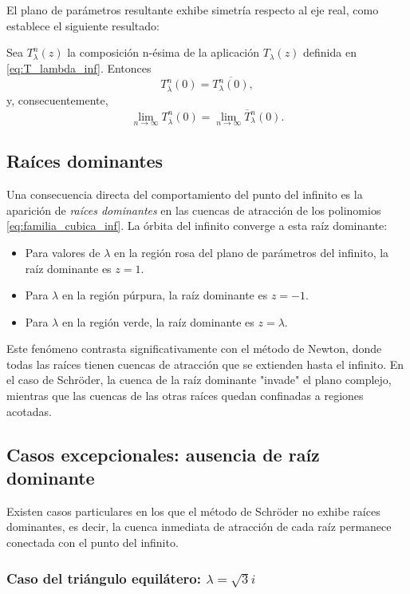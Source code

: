 El plano de parámetros resultante exhibe simetría respecto al eje real, como establece el siguiente resultado:

\begin{teorema}
Sea $T^n_\lambda(z)$ la composición n-ésima de la aplicación $T_\lambda(z)$ definida en \eqref{eq:T_lambda_inf}. Entonces
$$
T^n_{\overline{\lambda}}(0)=\overline{T^n_\lambda(0)},
$$
y, consecuentemente,
$$
\lim_{n\to\infty}T^n_{\overline{\lambda}}(0)=\overline{\lim_{n\to\infty}T^n_\lambda(0)}.
$$
\end{teorema}

\subsection{Raíces dominantes}

Una consecuencia directa del comportamiento del punto del infinito es la aparición de \emph{raíces dominantes} en las cuencas de atracción de los polinomios \eqref{eq:familia_cubica_inf}. La órbita del infinito converge a esta raíz dominante:

\begin{itemize}
\item Para valores de $\lambda$ en la región rosa del plano de parámetros del infinito, la raíz dominante es $z=1$.
\item Para $\lambda$ en la región púrpura, la raíz dominante es $z=-1$.
\item Para $\lambda$ en la región verde, la raíz dominante es $z=\lambda$.
\end{itemize}

Este fenómeno contrasta significativamente con el método de Newton, donde todas las raíces tienen cuencas de atracción que se extienden hasta el infinito. En el caso de Schröder, la cuenca de la raíz dominante "invade" el plano complejo, mientras que las cuencas de las otras raíces quedan confinadas a regiones acotadas.

\subsection{Casos excepcionales: ausencia de raíz dominante}

Existen casos particulares en los que el método de Schröder no exhibe raíces dominantes, es decir, la cuenca inmediata de atracción de cada raíz permanece conectada con el punto del infinito.

\subsubsection{Caso del triángulo equilátero: $\lambda=\sqrt{3}i$}

